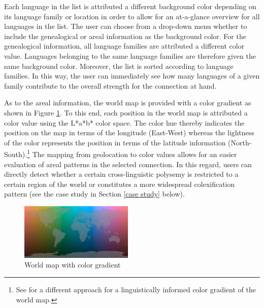 
Each language in the list is attributed a different background color depending on its language family or location in order to allow for an at-a-glance overview for all languages in the list. The user can choose from a drop-down menu whether to include the genealogical or areal information as the background color. For the genealogical information, all language families are attributed a different color value. Languages belonging to the same language families are therefore given the same background color. Moreover, the list is sorted according to language families. In this way, the user can immediately see how many languages of  a given family contribute to the overall strength for the connection at hand. 

As to the areal information, the world map is provided with a color gradient as shown in Figure \ref{World map}. To this end, each position in the world map is attributed a color value using the L*a*b* color space. The color hue thereby indicates the position on the map in terms of the longitude (East-West) whereas the lightness of the color represents the position in terms of the latitude information (North-South).\footnote{See \cite{MayerLanguageExplorer} for a different approach for a linguistically informed color gradient of the world map.}
The mapping from geolocation to color values allows for an easier evaluation of areal patterns in the selected connection. In this regard, users can directly detect whether a certain cross-linguistic polysemy is restricted to a certain region of the world or constitutes a more widespread colexification pattern (see the case study in Section \ref{case study} below).

\begin{figure}[htbp]
\begin{center}
\includegraphics[width=0.48\textwidth]{img/ColorScaleWorld.png}
\caption{World map with color gradient}
\label{World map}
\end{center}
\end{figure}



